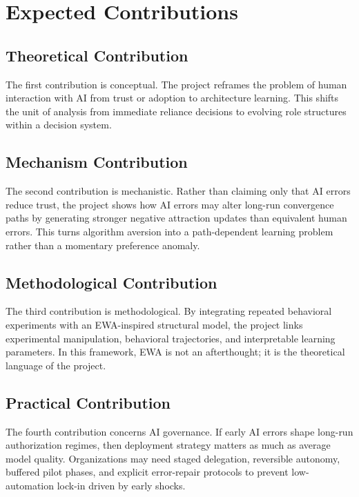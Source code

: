 \section{Expected Contributions}

\subsection{Theoretical Contribution}

The first contribution is conceptual. The project reframes the problem of human interaction with AI from trust or adoption to architecture learning. This shifts the unit of analysis from immediate reliance decisions to evolving role structures within a decision system.

\subsection{Mechanism Contribution}

The second contribution is mechanistic. Rather than claiming only that AI errors reduce trust, the project shows how AI errors may alter long-run convergence paths by generating stronger negative attraction updates than equivalent human errors. This turns algorithm aversion into a path-dependent learning problem rather than a momentary preference anomaly.

\subsection{Methodological Contribution}

The third contribution is methodological. By integrating repeated behavioral experiments with an EWA-inspired structural model, the project links experimental manipulation, behavioral trajectories, and interpretable learning parameters. In this framework, EWA is not an afterthought; it is the theoretical language of the project.

\subsection{Practical Contribution}

The fourth contribution concerns AI governance. If early AI errors shape long-run authorization regimes, then deployment strategy matters as much as average model quality. Organizations may need staged delegation, reversible autonomy, buffered pilot phases, and explicit error-repair protocols to prevent low-automation lock-in driven by early shocks.
